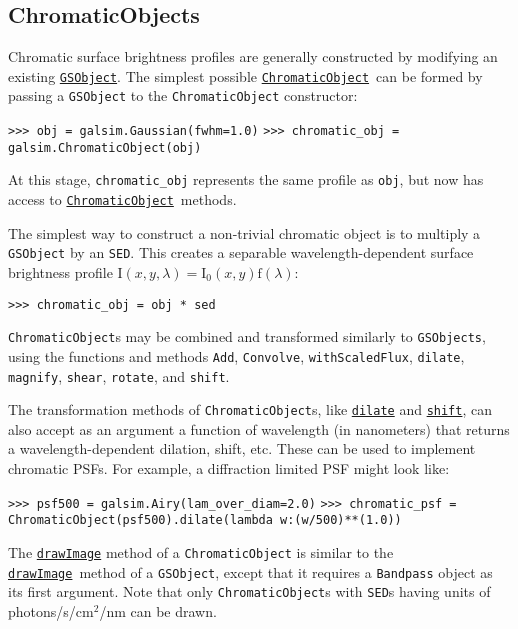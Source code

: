 \documentclass[preprint,10pt]{../../devel/modules/aastex}
\newcommand\GSObject{\href{http://galsim-developers.github.io/GalSim/classgalsim_1_1base_1_1_g_s_object.html}{\texttt{GSObject}}}
\newcommand\ChromaticObject{\href{http://galsim-developers.github.io/GalSim/classgalsim_1_1chromatic_1_1_chromatic_object.html}{\texttt{ChromaticObject}}}
\newcommand\drawImage{\href{http://galsim-developers.github.io/GalSim/classgalsim_1_1base_1_1_g_s_object.html\#aafe6ca9d84fe81543fbc105b897273db}{\texttt{drawImage}}}
\begin{document}
\subsection{ChromaticObjects}

Chromatic surface brightness profiles are generally constructed by modifying an existing
\GSObject.  The simplest possible \ChromaticObject\ can be formed by passing a
\texttt{GSObject} to the \texttt{ChromaticObject} constructor:

\texttt{>>> obj = galsim.Gaussian(fwhm=1.0)}\newline
\texttt{>>> chromatic\_obj = galsim.ChromaticObject(obj)}

At this stage, \texttt{chromatic\_obj} represents the same profile as \texttt{obj}, but
now has access to \ChromaticObject\ methods.

The simplest way to construct a non-trivial chromatic object is to multiply a \texttt{GSObject} by
an \texttt{SED}.  This creates a separable wavelength-dependent surface brightness profile
$\mathrm{I}(x, y, \lambda) = \mathrm{I}_0(x, y) \mathrm{f}(\lambda)$:

\texttt{>>> chromatic\_obj = obj * sed}

\texttt{ChromaticObject}s may be combined and transformed similarly to
\texttt{GSObjects}, using the functions and methods \texttt{Add}, \texttt{Convolve}, \texttt{withScaledFlux}, \texttt{dilate}, \texttt{magnify}, \texttt{shear}, \texttt{rotate}, and \texttt{shift}.

The transformation methods of \texttt{ChromaticObject}s, like \href{http://galsim-developers.github.io/GalSim/classgalsim_1_1chromatic_1_1_chromatic_object.html#adb05a4f0dadc3c7cbc361ec97984e6f1}{\texttt{dilate}} and \href{http://galsim-developers.github.io/GalSim/classgalsim_1_1chromatic_1_1_chromatic_object.html#ab266ee1207d60ba7a9fb6b32a4ef6ab2}{\texttt{shift}},
can also accept as an argument a function of wavelength (in nanometers)
that returns a wavelength-dependent dilation, shift, etc.  These can be used to implement
chromatic PSFs.  For example, a diffraction limited PSF might look
like:

\texttt{>>> psf500 = galsim.Airy(lam\_over\_diam=2.0)}\newline
\texttt{>>> chromatic\_psf = ChromaticObject(psf500).dilate(lambda w:(w/500)**(1.0))}

The \href{http://galsim-developers.github.io/GalSim/classgalsim_1_1chromatic_1_1_chromatic_object.html#a4228098295ee04e4f491567a9ce3b28f}{\texttt{drawImage}} method of a \texttt{ChromaticObject} is similar to the \drawImage\ method of a \texttt{GSObject},
except that it requires a \texttt{Bandpass} object as its first
argument.  Note that only \texttt{ChromaticObject}s with \texttt{SED}s having units of photons/s/cm$^2$/nm can be drawn.
\end{document}
